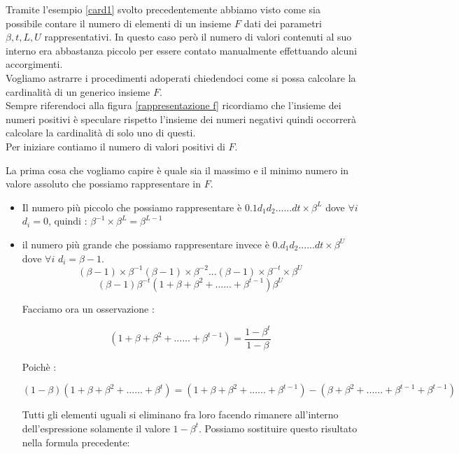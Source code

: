 \documentclass[12pt, a4paper]{book}
\theoremstyle{definition}
\begin{document}
\begin{flushleft}

Tramite l'esempio \ref{card1} svolto precedentemente abbiamo visto come sia possibile contare il numero di elementi di un insieme $F$ dati dei  parametri $\beta, t, L,U$ rappresentativi.  In questo caso però il numero di valori contenuti al suo interno era abbastanza piccolo per essere contato manualmente effettuando alcuni accorgimenti.\\
Vogliamo astrarre i procedimenti adoperati chiedendoci come si possa calcolare la cardinalità di un generico insieme $F$.\\
\vspace{1em}
Sempre riferendoci alla figura \ref{rappresentazione f} ricordiamo che l'insieme dei numeri positivi è speculare rispetto l'insieme dei numeri negativi quindi occorrerà calcolare la cardinalità di solo uno di questi.\\

Per iniziare contiamo il numero di valori positivi di $F$. 

La prima cosa che vogliamo capire è quale sia il massimo e il minimo numero in valore assoluto che possiamo rappresentare in $F$.  \\
\begin{itemize}
	\item Il numero più piccolo che possiamo rappresentare è $0.1d_{1}d_{2}......d{t} \times \beta^{L}$ dove $\forall i $ $d_{i} = 0$, quindi : $\beta^{-1}\times\beta^{L}=\beta^{L-1}$ 
	\item il numero più grande che possiamo rappresentare invece è $0.d_{1}d_{2}......d{t} \times \beta^{U}$ dove $\forall i $ $d_{i} = \beta - 1$. 
\[ (\beta -1)\times\beta^{-1}(\beta -1)\times\beta^{-2}...(\beta -1)\times\beta^{-t} \times \beta^{U} \]
\[ (\beta -1) \beta^{-t}(1 + \beta + \beta^{2} +......+ \beta^{t-1})\beta^{U} \]

Facciamo ora un osservazione :

\[ (1 + \beta + \beta^{2} +......+ \beta^{t-1})  = \frac{1-\beta^{t}}{1-\beta}\]

Poichè :

\[ (1-\beta)(1 + \beta + \beta^{2} +......+ \beta^{t}) = (1 + \beta + \beta^{2} +......+ \beta^{t-1}) - (\beta + \beta^{2} +......+ \beta^{t-1} + \beta^{t-1}) \]

Tutti gli elementi uguali si eliminano fra loro facendo rimanere all'interno dell'espressione solamente il valore $1-\beta^{t}$. Possiamo sostituire questo risultato nella formula precedente: 


\end{itemize}
\end{flushleft}
\end{document}
